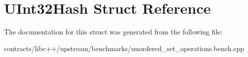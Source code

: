 \hypertarget{struct_u_int32_hash}{}\section{U\+Int32\+Hash Struct Reference}
\label{struct_u_int32_hash}


The documentation for this struct was generated from the following file\+:\begin{DoxyCompactItemize}
\item 
contracts/libc++/upstream/benchmarks/unordered\+\_\+set\+\_\+operations.\+bench.\+cpp\end{DoxyCompactItemize}
